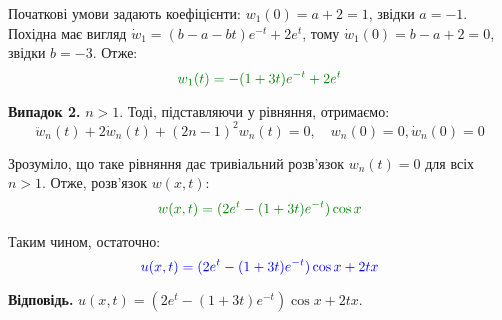 \documentclass{hw_template}
\begin{document}
Початкові умови задають коефіцієнти: $w_1(0) = a+2=1$, звідки $a=-1$. 
Похідна має вигляд $\dot{w}_1 = (b-a-bt)e^{-t}+2e^t$, тому 
$\dot{w}_1(0) = b-a+2=0$, звідки $b=-3$. Отже:
\begin{equation*}
    \textcolor{green!50!black}{w_1(t) = -(1+3t)e^{-t}+2e^t}
\end{equation*}

\textbf{Випадок 2.} $n>1$. Тоді, підставляючи у рівняння, отримаємо:
\begin{equation*}
    \ddot{w}_n(t) + 2\dot{w}_n(t) + (2n-1)^2w_n(t) = 0, \quad w_n(0)=0, \dot{w}_n(0)=0
\end{equation*}

Зрозуміло, що таке рівняння дає тривіальний розв'язок $w_n(t)=0$ для всіх 
$n>1$. Отже, розв'язок $w(x,t)$:
\begin{equation*}
    \textcolor{green!50!black}{w(x,t) = (2e^t - (1+3t)e^{-t})\cos x}
\end{equation*}

Таким чином, остаточно:
\begin{equation*}
    \textcolor{blue}{u(x,t) =(2e^t - (1+3t)e^{-t})\cos x + 2tx}
\end{equation*}

\textbf{Відповідь.} $u(x,t) = (2e^t - (1+3t)e^{-t})\cos x + 2tx$.
\end{document}
